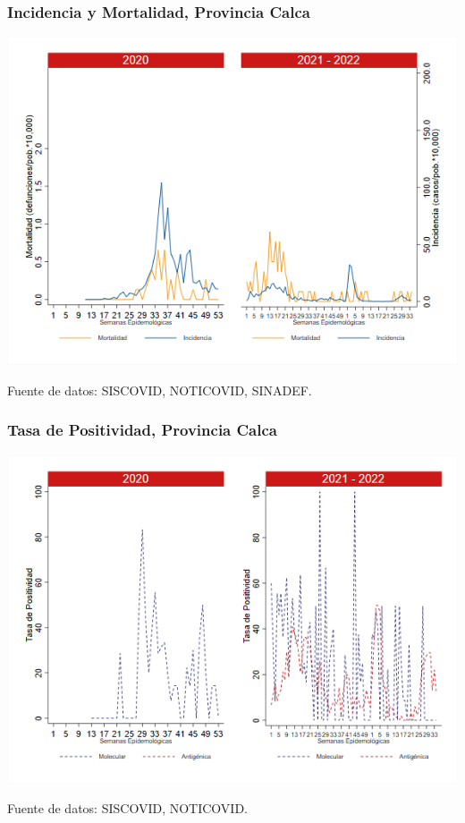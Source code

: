 \documentclass[xcolor=table]{beamer}
\begin{document}
\begin{frame}[label=Calca]
	\frametitle{Incidencia y Mortalidad, Provincia Calca}
	\vspace{-.5cm}
	\begin{center}
		\includegraphics[width=0.8\linewidth, trim={0cm .5cm 0cm 0.2cm},clip]{../figuras/incidencia_mortalidad_20_21_3.png}
	\end{center}
	{\tiny Fuente de datos: SISCOVID, NOTICOVID, SINADEF.}
\end{frame}

\begin{frame}
	\frametitle{Tasa de Positividad, Provincia Calca}
	\vspace{-.5cm}
	\begin{center}
		\includegraphics[width=0.8\linewidth, trim={0cm .5cm 0cm 0.2cm},clip]{../figuras/positividad_20_21_3.png}
	\end{center}
	{\tiny Fuente de datos: SISCOVID, NOTICOVID.}
\end{frame}
\end{document}
